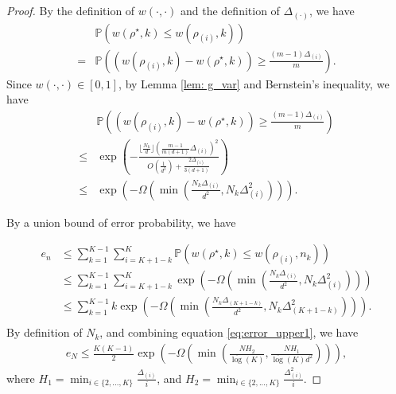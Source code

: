 \begin{proof}
    By the definition of $w(\cdot,\cdot)$ and the definition of $\Delta_{(\cdot)}$, we have
    \begin{equation*}
        \begin{aligned}
            & \mathbb{P}(w({\rho^\star,k}) \leq w({\rho_{(i)},k})) \\
            = & \mathbb{P}\left( (w(\rho_{(i)},k) -  w(\rho^\star,k))  \geq \frac{(m-1)\Delta_{(i)}}{m}\right).
        \end{aligned}
    \end{equation*}
    Since $w(\cdot,\cdot) \in [0,1]$, by Lemma \ref{lem: g_var} and Bernstein's inequality, we have
    \begin{equation}
        \begin{aligned}
            & \mathbb{P}\left( (w(\rho_{(i)},k) -  w(\rho^\star,k))  \geq \frac{(m-1)\Delta_{(i)}}{m}\right) \\
            \leq & \exp\left(-\frac{\lfloor \frac{N_k}{d}\rfloor \left(\frac{m-1}{m(d+1)}\Delta_{(i)}\right)^2}{O(\frac{1}{d^3}) + \frac{2\Delta_{(i)}}{3(d+1)}}\right) \\
            \leq & \exp\left( -\Omega\left( \min\left( \frac{N_k \Delta_{(i)}}{d^2}, N_k \Delta_{(i)}^2\right)\right)\right).
        \end{aligned}
    \end{equation}

    By a union bound of error probability, we have 

    \begin{equation} \label{eq:error_upper1}
        \begin{aligned} 
            e_n & \leq \sum_{k=1}^{K-1}\sum_{i = K+1-k}^K \mathbb{P}(w({\rho^\star,k}) \leq w({\rho_{(i)},n_k})) \\
            & \leq \sum_{k=1}^{K-1}\sum_{i = K+1-k}^K \exp\left( - \Omega\left( \min\left( \frac{N_k \Delta_{(i)}}{d^2}, N_k \Delta_{(i)}^2\right)\right)\right) \\
            &  \leq \sum_{k=1}^{K-1} k \exp\left( -\Omega\left( \min\left( \frac{N_k \Delta_{(K+1-k)}}{d^2}, N_k \Delta_{(K+1-k)}^2\right)\right)\right). \\
        \end{aligned}
    \end{equation}
    By definition of $N_k$, and combining equation \eqref{eq:error_upper1}, we have
    \begin{equation*}
    \begin{aligned}
        e_N  \leq \frac{K(K-1)}{2} \exp\left(- \Omega\left(\min\left(\frac{N H_2}{\overline{\log}(K)}, \frac{N H_1}{\overline{\log}(K)d^2}\right)\right) \right),
    \end{aligned}
    \end{equation*}
    where $H_1 = \min_{i \in \{2,...,K\}} \frac{\Delta_{(i)}}{i}$, and $H_2 = \min_{i \in \{2,...,K\}} \frac{\Delta^2_{(i)}}{i}$.

\end{proof}



